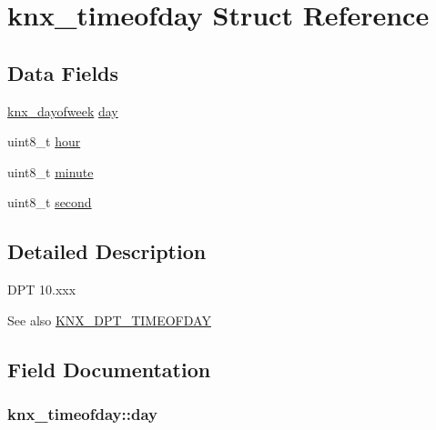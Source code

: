 \hypertarget{structknx__timeofday}{}\section{knx\+\_\+timeofday Struct Reference}
\label{structknx__timeofday}
\subsection*{Data Fields}
\begin{DoxyCompactItemize}
\item 
\hyperlink{data_8h_a4115b18806232d8c24c22b7785802768}{knx\+\_\+dayofweek} \hyperlink{structknx__timeofday_a4f147127718c17b4bde2fcb40321cbf7}{day}
\item 
uint8\+\_\+t \hyperlink{structknx__timeofday_ae1f058227758a38c2cb480ad75509e89}{hour}
\item 
uint8\+\_\+t \hyperlink{structknx__timeofday_a5799bfbd83e86f690115d0f5c4658eab}{minute}
\item 
uint8\+\_\+t \hyperlink{structknx__timeofday_a4c011f667b95b070e86fba92510d1590}{second}
\end{DoxyCompactItemize}


\subsection{Detailed Description}
D\+PT 10.\+xxx \begin{DoxySeeAlso}{See also}
\hyperlink{data_8h_a6e79f8a1b8ff1d0dff30d1fdb401b642ad62f29443898165e3bc3da38e329a351}{K\+N\+X\+\_\+\+D\+P\+T\+\_\+\+T\+I\+M\+E\+O\+F\+D\+AY} 
\end{DoxySeeAlso}


\subsection{Field Documentation}
\subsubsection[{\texorpdfstring{day}{day}}]{ knx\+\_\+timeofday\+::day}\hypertarget{structknx__timeofday_a4f147127718c17b4bde2fcb40321cbf7}{}\label{structknx__timeofday_a4f147127718c17b4bde2fcb40321cbf7}
